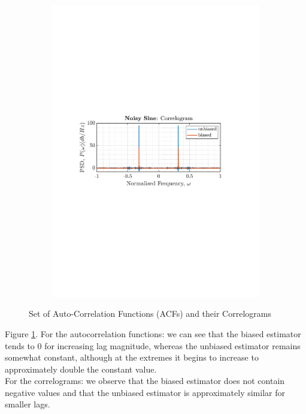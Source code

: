 \documentclass[12pt]{article}
\numberwithin{equation}{section}
\begin{document}
\begin{figure}[H]
\begin{subfigure}{0.49\textwidth}
			\includegraphics[trim={2.2cm 11.2cm 3.15cm  11.2cm}, clip, width=\textwidth]{../MATLAB/figures/q1_3a_fig03.pdf} 
		\end{subfigure}
		\captionsetup{justification=centering}
		\caption{Set of Auto-Correlation Functions (ACFs) and their Correlograms}
		\label{fig: 1-3a}
	\end{figure}
	
	Figure \ref{fig: 1-3a}. For the autocorrelation functions: we can see that the biased estimator tends to 0 for increasing lag magnitude, whereas the unbiased estimator remains somewhat constant, although at the extremes it begins to increase to approximately double the constant value.\\
	For the correlograms: we observe that the biased estimator does not contain negative values and that the unbiased estimator is approximately similar for smaller lags.
	
\end{document}
